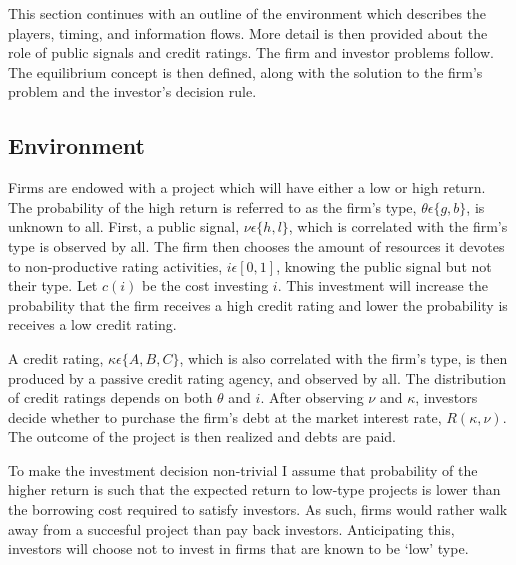 \documentclass[notitlepage]{article}
\begin{document}
This section continues with an outline of the environment which describes the players, timing, and information flows. More detail is then provided about the role of public signals and credit ratings. The firm and investor problems follow. The equilibrium concept is then defined, along with the solution to the firm's problem and the investor's decision rule.

\subsection{Environment}
Firms are endowed with a project which will have either a low or high return. The probability of the high return is referred to as the firm's type, $\theta \epsilon \{g,b\}$, is unknown to all. First, a public signal, $\nu \epsilon \{h,l\}$, which is correlated with the firm's type is observed by all. The firm then chooses the amount of resources it devotes to non-productive rating activities, $i  \epsilon [0,1]$, knowing the public signal but not their type. Let $c(i)$ be the cost investing $i$. This investment will increase the probability that the firm receives a high credit rating and lower the probability is receives a low credit rating.

A credit rating, $\kappa \epsilon \{A,B,C\}$, which is also correlated with the firm's type, is then produced by a passive credit rating agency, and observed by all. The distribution of credit ratings depends on both $\theta$ and $i$. After observing $\nu$ and $\kappa$, investors decide whether to purchase the firm's debt at the market interest rate, $R(\kappa,\nu)$. The outcome of the project is then realized and debts are paid.

To make the investment decision non-trivial I assume that probability of the higher return is such that the expected return to low-type projects is lower than the borrowing cost required to satisfy investors. As such, firms would rather walk away from a succesful project than pay back investors. Anticipating this, investors will choose not to invest in firms that are known to be `low' type.
\end{document}
